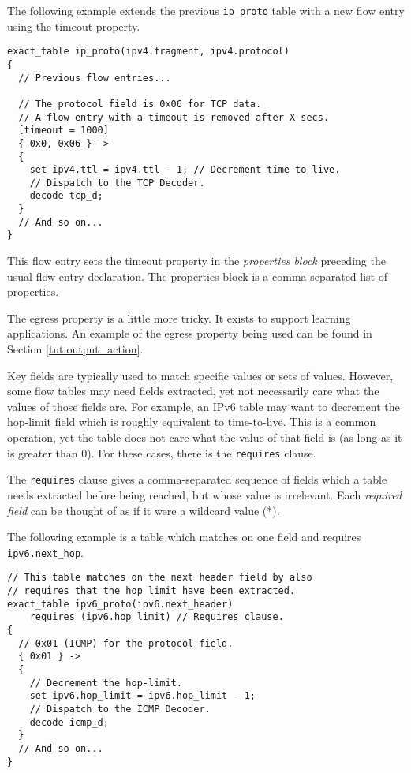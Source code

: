 The following example extends the previous \texttt{ip\_proto} table with a new flow entry using the timeout property.

\begin{codepage}
\begin{lstlisting}
exact_table ip_proto(ipv4.fragment, ipv4.protocol)
{
  // Previous flow entries...

  // The protocol field is 0x06 for TCP data.
  // A flow entry with a timeout is removed after X secs.
  [timeout = 1000]
  { 0x0, 0x06 } ->
  {
  	set ipv4.ttl = ipv4.ttl - 1; // Decrement time-to-live.
  	// Dispatch to the TCP Decoder.
  	decode tcp_d;
  }
  // And so on...
}
\end{lstlisting}
\end{codepage}

This flow entry sets the timeout property in the \textit{properties block}
preceding the usual flow entry declaration. The properties block is a
comma-separated list of properties.

The egress property is a little more tricky. It exists to support learning applications. An example of the egress property being used can be found in Section \ref{tut:output_action}.

Key fields are typically used to match specific values or sets of values. However, some flow tables may need fields extracted, yet not
necessarily care what the values of those fields are. For example, an IPv6 table
may want to decrement the hop-limit field which is roughly equivalent to time-to-live. This is a common operation, yet the table
does not care what the value of that field is (as long as it is greater than 0).
For these cases, there is the \texttt{requires} clause.

The \texttt{requires} clause gives a comma-separated sequence of fields which a table needs
extracted before being reached, but whose value is irrelevant. Each
\textit{required field} can be thought of as if it were a wildcard value (*).

The following example is a table which matches on one field and requires
\texttt{ipv6.next\_hop}.

\begin{codepage}
\begin{lstlisting}
// This table matches on the next header field by also
// requires that the hop limit have been extracted.
exact_table ipv6_proto(ipv6.next_header)
	requires (ipv6.hop_limit) // Requires clause.
{
  // 0x01 (ICMP) for the protocol field.
  { 0x01 } ->
  {
  	// Decrement the hop-limit.
  	set ipv6.hop_limit = ipv6.hop_limit - 1; 
  	// Dispatch to the ICMP Decoder.
  	decode icmp_d;
  }
  // And so on...
}
\end{lstlisting}
\end{codepage}



